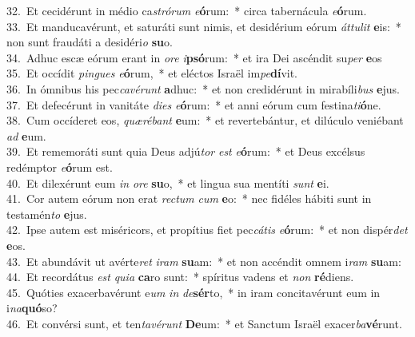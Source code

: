 {32.~}Et cecidérunt in médio ca\textit{stró}\textit{rum} \textit{e}\textbf{ó}rum:~* circa tabernácula \textit{e}\textbf{ó}rum.\\
{33.~}Et manducavérunt, et saturáti sunt nimis, et desidérium eórum \textit{át}\textit{tu}\textit{lit} \textbf{e}is:~* non sunt fraudáti a desidéri\textit{o} \textbf{su}o.\\
{34.~}Adhuc escæ eórum erant in \textit{o}\textit{re} \textit{i}\textbf{psó}rum:~* et ira Dei ascéndit su\textit{per} \textbf{e}os\\
{35.~}Et occídit \textit{pin}\textit{gues} \textit{e}\textbf{ó}rum,~* et eléctos Israël im\textit{pe}\textbf{dí}vit.\\
{36.~}In ómnibus his pec\textit{ca}\textit{vé}\textit{runt} \textbf{a}dhuc:~* et non credidérunt in mirabíli\textit{bus} \textbf{e}jus.\\
{37.~}Et defecérunt in vanitáte \textit{di}\textit{es} \textit{e}\textbf{ó}rum:~* et anni eórum cum festina\textit{ti}\textbf{ó}ne.\\
{38.~}Cum occíderet eos, \textit{quæ}\textit{ré}\textit{bant} \textbf{e}um:~* et revertebántur, et dilúculo veniébant \textit{ad} \textbf{e}um.\\
{39.~}Et rememoráti sunt quia Deus adjú\textit{tor} \textit{est} \textit{e}\textbf{ó}rum:~* et Deus excélsus redémptor \textit{e}\textbf{ó}rum est.\\
{40.~}Et dilexérunt eum \textit{in} \textit{o}\textit{re} \textbf{su}o,~* et lingua sua mentíti \textit{sunt} \textbf{e}i.\\
{41.~}Cor autem eórum non erat \textit{re}\textit{ctum} \textit{cum} \textbf{e}o:~* nec fidéles hábiti sunt in testamén\textit{to} \textbf{e}jus.\\
{42.~}Ipse autem est miséricors, et propítius fiet pec\textit{cá}\textit{tis} \textit{e}\textbf{ó}rum:~* et non dispér\textit{det} \textbf{e}os.\\
{43.~}Et abundávit ut avérte\textit{ret} \textit{i}\textit{ram} \textbf{su}am:~* et non accéndit omnem i\textit{ram} \textbf{su}am:\\
{44.~}Et recordátus \textit{est} \textit{qui}\textit{a} \textbf{ca}ro sunt:~* spíritus vadens et \textit{non} \textbf{ré}diens.\\
{45.~}Quóties exacerbavérunt e\textit{um} \textit{in} \textit{de}\textbf{sér}to,~* in iram concitavérunt eum in i\textit{na}\textbf{quó}so?\\
{46.~}Et convérsi sunt, et ten\textit{ta}\textit{vé}\textit{runt} \textbf{De}um:~* et Sanctum Israël exacer\textit{ba}\textbf{vé}runt.\\
